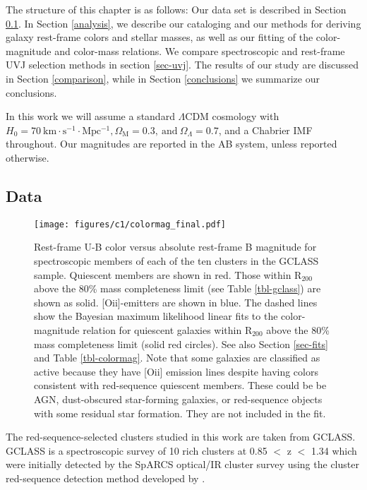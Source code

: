 The structure of this chapter is as follows:
Our data set is described in Section \ref{data}.
In Section \ref{analysis}, we describe our cataloging and our methods for deriving galaxy rest-frame colors and stellar masses, as well as our fitting of the color-magnitude and color-mass relations. We compare spectroscopic and rest-frame UVJ selection methods in section \ref{sec-uvj}.
The results of our study are discussed in Section \ref{comparison}, while in Section \ref{conclusions} we summarize our conclusions.

In this work we will assume a standard $\Lambda$CDM cosmology with $H_0 = 70 \mathrm{\ km \cdot s^{-1} \cdot Mpc^{-1}}, \Omega_\mathrm{M} = 0.3, \mathrm{\ and\ } \Omega_\Lambda = 0.7$, and a Chabrier IMF \citep{chabrierimf} throughout. Our magnitudes are reported in the AB system, unless reported otherwise.

\subsection{Data}\label{data}
\begin{figure*}
\centering \texttt{[image: figures/c1/colormag\_final.pdf]}
\caption[Color-magnitude diagram for the GCLASS cluster sample]{Rest-frame U-B color versus absolute rest-frame B magnitude for spectroscopic members of each of the ten clusters in the GCLASS sample.
Quiescent members are shown in red. Those within R$_{200}$ above the 80\% mass completeness limit (see Table \ref{tbl-gclass}) are shown as solid. [O{\sc ii}]-emitters are shown in blue. The dashed lines show the Bayesian maximum likelihood linear fits to the color-magnitude relation for quiescent galaxies within R$_{200}$ above the 80\% mass completeness limit (solid red circles). See also Section \ref{sec-fits} and Table \ref{tbl-colormag}.
Note that some galaxies are classified as active because they have [O{\sc ii}] emission lines despite having colors consistent with red-sequence quiescent members. These could be be AGN, dust-obscured star-forming galaxies, or red-sequence objects with some residual star formation. They are not included in the fit.\label{fig-colormag}}
\end{figure*}

The red-sequence-selected clusters studied in this work are taken from GCLASS. GCLASS is a spectroscopic survey of 10 rich clusters at 0.85 $<$ z $<$ 1.34 which were initially detected by the SpARCS optical/IR cluster survey using the cluster red-sequence detection method developed by \cite{Gladders:2000rq} \citep[see][]{Muzzin:2009jm,Wilson:2009ws,Demarco:2010om}.

